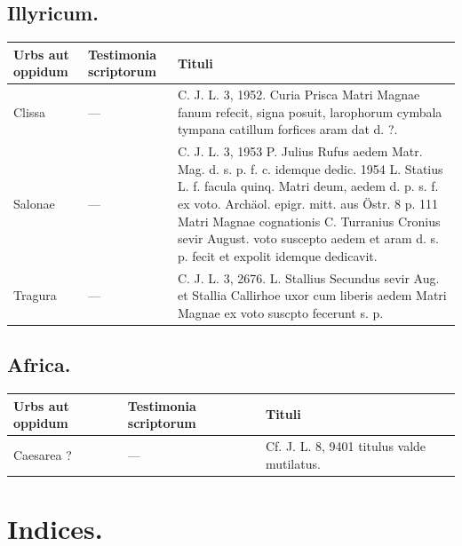 \documentclass[a4paper, 11pt, oneside, polutonikogreek, german, twocolumn]{article}
\begin{document}
\subsection{Illyricum.}
\begin{table}[H]
    \centering
    \begin{tabular}{|p{45mm}|p{45mm}|p{60mm}|}
    \hline
        \textbf{Urbs aut oppidum} & \textbf{Testimonia scriptorum} & \textbf{Tituli} \\ \hline
        Clissa & --- & C. J. L. 3, 1952. Curia Prisca Matri Magnae fanum refecit, signa posuit, larophorum cymbala tympana catillum forfices aram dat d. ?. \\ \hline
        Salonae & --- & C. J. L. 3, 1953 P. Julius Rufus aedem Matr. Mag. d. s. p. f. c. idemque dedic. 1954 L. Statius L. f. facula quinq. Matri deum, aedem d. p. s. f. ex voto. Archäol. epigr. mitt. aus Östr. 8 p. 111 Matri Magnae cognationis C. Turranius Cronius sevir August. voto suscepto aedem et aram d. s. p. fecit et expolit idemque dedicavit. \\ \hline
        Tragura & --- & C. J. L. 3, 2676. L. Stallius Secundus sevir Aug. et Stallia Callirhoe uxor cum liberis aedem Matri Magnae ex voto suscpto fecerunt s. p. \\ \hline
    \end{tabular}
\end{table}
\subsection{Africa.}
\begin{table}[H]
    \centering
    \begin{tabular}{|p{45mm}|p{45mm}|p{60mm}|}
    \hline
        Urbs aut oppidum & Testimonia scriptorum & Tituli \\ \hline
        Caesarea ? & --- & Cf. J. L. 8, 9401 titulus valde mutilatus. \\ \hline
    \end{tabular}
\end{table}
\clearpage
\twocolumn
\section{Indices.}
\end{document}
